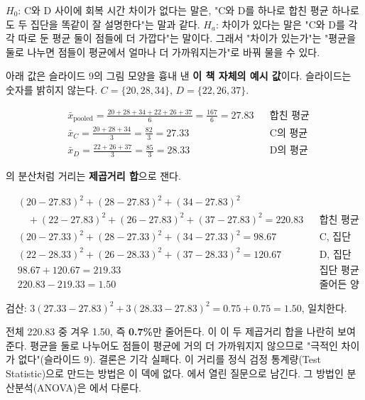 $H_0$: C와 D 사이에 회복 시간 차이가 없다는 말은, "C와 D를 하나로 합친 평균
하나로도 두 집단을 똑같이 잘 설명한다"는 말과 같다. $H_a$: 차이가 있다는
말은 "C와 D를 각각 따로 둔 평균 둘이 점들에 더 가깝다"는 말이다. 그래서
"차이가 있는가"는 "평균을 둘로 나누면 점들이 평균에서 얼마나 더 가까워지는가"로
바꿔 물을 수 있다.

\begin{example}[합친 평균 대 집단 평균]
\label{ex:ht-distance}
아래 값은 슬라이드 9의 그림 모양을
흉내 낸 \textbf{이 책 자체의 예시 값}이다. 슬라이드는 숫자를 밝히지 않는다.
$C = \{20, 28, 34\}$, $D = \{22, 26, 37\}$.

\begin{align*}
  &\bar{x}_{\text{pooled}} = \frac{20+28+34+22+26+37}{6} = \frac{167}{6} = 27.83
    && \text{합친 평균}\\
  &\bar{x}_C = \frac{20+28+34}{3} = \frac{82}{3} = 27.33 && \text{C의 평균}\\
  &\bar{x}_D = \frac{22+26+37}{3} = \frac{85}{3} = 28.33 && \text{D의 평균}
\end{align*}

의 분산처럼 거리는 \textbf{제곱거리 합}으로 잰다.

\begin{align*}
  &(20-27.83)^2+(28-27.83)^2+(34-27.83)^2 \\
  &\quad +(22-27.83)^2+(26-27.83)^2+(37-27.83)^2 = 220.83
    && \text{합친 평균에서의 제곱거리 합}\\
  &(20-27.33)^2+(28-27.33)^2+(34-27.33)^2 = 98.67 && \text{C, 집단 평균에서}\\
  &(22-28.33)^2+(26-28.33)^2+(37-28.33)^2 = 120.67 && \text{D, 집단 평균에서}\\
  &98.67 + 120.67 = 219.33 && \text{집단 평균에서의 제곱거리 합}\\
  &220.83 - 219.33 = 1.50 && \text{줄어든 양}
\end{align*}

검산: $3(27.33-27.83)^2 + 3(28.33-27.83)^2 = 0.75+0.75 = 1.50$, 일치한다.

전체 220.83 중 겨우 1.50, 즉 \textbf{0.7\%}만 줄어든다. 이
이 두 제곱거리 합을 나란히 보여준다. 평균을 둘로 나누어도 점들이 평균에
거의 더 가까워지지 않으므로 "극적인 차이가 없다"(슬라이드 9). 결론은
기각 실패다. 이 거리를 정식 검정 통계량(Test Statistic)으로 만드는 방법은
이 덱에 없다. 에서 열린 질문으로 남긴다.
그 방법인 분산분석(ANOVA)은 에서 다룬다.
\end{example}

